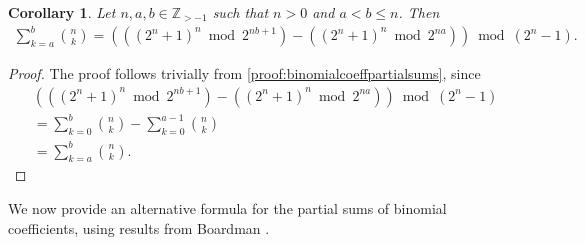 \documentclass[10pt,a4paper]{article}
\theoremstyle{plain}
\newtheorem{corollary}{Corollary}[section]
\newcommand{\Z}{\mathbb{Z}}
\begin{document}
\begin{corollary}
Let $n,a,b \in \Z_{>-1}$ such that $n>0$ and $a < b \leq n$. Then
\begin{align*}
\sum_{k=a}^{b} \binom{n}{k}
=
\left(
    \left( (2^n+1)^n \bmod 2^{nb+1} \right)
    - \left( (2^n+1)^n \bmod 2^{na} \right)
\right)
\bmod (2^n-1) .
\end{align*}
\end{corollary}
\begin{proof}
The proof follows trivially from \cref{proof:binomialcoeffpartialsums}, since
\begin{align*}
& \left(
\left( (2^n+1)^n \bmod 2^{nb+1} \right)
- \left( (2^n+1)^n \bmod 2^{na} \right)
\right)
\bmod (2^n-1) \\
&= \sum_{k=0}^{b} \binom{n}{k} - \sum_{k=0}^{a-1} \binom{n}{k} \\
&= \sum_{k=a}^{b} \binom{n}{k} .
\end{align*}
\end{proof}
We now provide an alternative formula for the partial sums of binomial coefficients, using results from Boardman \cite{boardman2004eggdropnumbers}.
\end{document}

